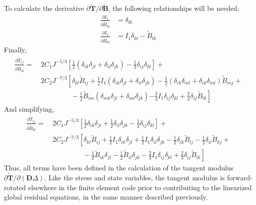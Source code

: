 To calculate the derivative $\partial \tilde{\bm T}/\partial {\tilde{\bm {B}}}$, the following relationships will be needed:
\begin{align}
\frac{\partial I_1}{\partial \tilde{B}_{kl}} &= \delta_{lk}  \\
\frac{\partial I_2}{\partial \tilde{B}_{kl}} &= I_1\delta_{kl} - \tilde{B}_{lk}
\end{align}
Finally,
\begin{equation}
\begin{aligned}
\frac{\partial \tilde{T}_{ij}}{\partial \tilde{B}_{kl}} = &\ 2C_1J^{-5/3}\left[\frac{1}{2}\left(\delta_{ik}\delta_{jl} + \delta_{il}\delta_{jk}\right) - \frac{1}{3}\delta_{ij}\delta_{kl}\right] + \\
&\ 2C_2J^{-7/3}\left[\delta_{kl}\tilde{B}_{ij} + \frac{1}{2}I_1\left(\delta_{ik}\delta_{jl} + \delta_{il}\delta_{jk}\right) -\frac{1}{2}\left(\delta_{ik}\delta_{ml} + \delta_{ik}\delta_{ml}\right)\tilde{B}_{mj} \right. + \\
&\phantom{xxxxxxxx}-\frac{1}{2}\tilde{B}_{im}\left(\delta_{mk}\delta_{jl} +\delta_{ml}\delta_{jk}\right) 
\left.- \frac{2}{3}I_1\delta_{ij}\delta_{kl} + \frac{2}{3}\delta_{ij}\tilde{B}_{lk}\right]
\end{aligned}
\end{equation}
And simplifying,
\begin{equation}
\begin{aligned}
\frac{\partial \tilde{T}_{ij}}{\partial \tilde{B}_{kl}} = &\ 2C_1J^{-5/3}\left[\frac{1}{2}\delta_{ik}\delta_{jl} + \frac{1}{2}\delta_{il}\delta_{jk} - \frac{1}{3}\delta_{ij}\delta_{kl}\right] + \\
&\ 2C_2J^{-7/3}\left[\delta_{kl}\tilde{B}_{ij} + \frac{1}{2}I_1\delta_{ik}\delta_{jl} + \frac{1}{2}I_1\delta_{il}\delta_{jk} -\frac{1}{2}\delta_{ik}\tilde{B}_{lj} -\frac{1}{2}\delta_{il}\tilde{B}_{kj} \right. + \\
&\left.\phantom{xxxxxxxx}-\frac{1}{2}\tilde{B}_{ik}\delta_{jl} -\frac{1}{2}\tilde{B}_{il}\delta_{jk} - \frac{2}{3}I_1\delta_{ij}\delta_{kl} + \frac{2}{3}\delta_{ij}\tilde{B}_{lk}\right]
\end{aligned}
\end{equation}
Thus, all terms have been defined in the calculation of the tangent modulus $\partial{\tilde{\bm{T}}}/\partial({\bm{D}\Delta})$. Like the stress and state variables, the tangent modulus is forward-rotated elsewhere in the finite element code prior to contributing to the linearized global residual equations, in the same manner described previously.

